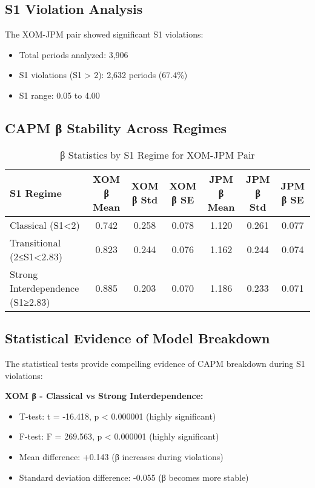 \documentclass[11pt,a4paper]{article}
\begin{document}
\subsection{S1 Violation Analysis}
The XOM-JPM pair showed significant S1 violations:
\begin{itemize}
\item Total periods analyzed: 3,906
\item S1 violations (S1 > 2): 2,632 periods (67.4\%)
\item S1 range: 0.05 to 4.00
\end{itemize}

\subsection{CAPM β Stability Across Regimes}

\begin{table}[H]
\centering
\caption{β Statistics by S1 Regime for XOM-JPM Pair}
\begin{tabular}{lcccccc}
\toprule
S1 Regime & XOM β Mean & XOM β Std & XOM β SE & JPM β Mean & JPM β Std & JPM β SE \\
\midrule
Classical (S1<2) & 0.742 & 0.258 & 0.078 & 1.120 & 0.261 & 0.077 \\
Transitional (2≤S1<2.83) & 0.823 & 0.244 & 0.076 & 1.162 & 0.244 & 0.074 \\
Strong Interdependence (S1≥2.83) & 0.885 & 0.203 & 0.070 & 1.186 & 0.233 & 0.071 \\
\bottomrule
\end{tabular}
\end{table}

\subsection{Statistical Evidence of Model Breakdown}

The statistical tests provide compelling evidence of CAPM breakdown during S1 violations:

\textbf{XOM β - Classical vs Strong Interdependence:}
\begin{itemize}
\item T-test: t = -16.418, p < 0.000001 (highly significant)
\item F-test: F = 269.563, p < 0.000001 (highly significant)
\item Mean difference: +0.143 (β increases during violations)
\item Standard deviation difference: -0.055 (β becomes more stable)
\end{itemize}
\end{document}
